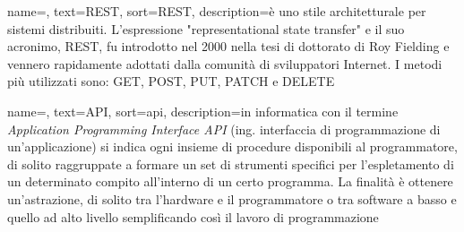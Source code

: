 






{
    name=,
    text=REST,
    sort=REST,
    description={è uno stile architetturale per sistemi distribuiti. L'espressione "representational state transfer" e il suo acronimo, REST, fu introdotto nel 2000 nella tesi di dottorato di Roy Fielding e vennero rapidamente adottati dalla comunità di sviluppatori Internet. I metodi più utilizzati sono: GET, POST, PUT, PATCH e DELETE}
}

{
    name=,
    text=API,
    sort=api,
    description={in informatica con il termine \emph{Application Programming Interface API} (ing. interfaccia di programmazione di un'applicazione) si indica ogni insieme di procedure disponibili al programmatore, di solito raggruppate a formare un set di strumenti specifici per l'espletamento di un determinato compito all'interno di un certo programma. La finalità è ottenere un'astrazione, di solito tra l'hardware e il programmatore o tra software a basso e quello ad alto livello semplificando così il lavoro di programmazione}
}

